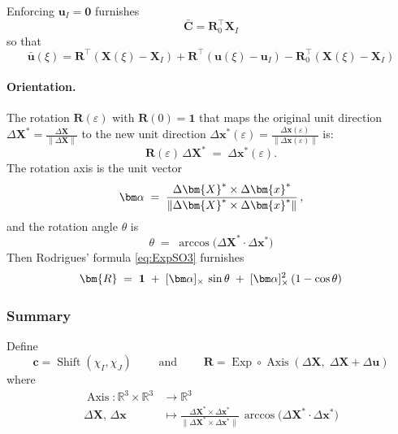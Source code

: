 Enforcing \(\bm{u}_I = \mathbf{0}\) furnishes
\begin{equation}
\bar{\bm{C}} = \bm{R}_0^{\top}\bm{X}_I
\label{eq:init-Cbar}
\end{equation}
so that
\begin{equation*}
\bar{\bm{u}}(\xi) = \bm{R}^{\top}(\bm{X}(\xi)-\bm{X}_I) 
 + \bm{R}^{\top}(\bm{u}(\xi)-\bm{u}_I)
 - \bm{R}_0^{\top}(\bm{X}(\xi) - \bm{X}_I)
\end{equation*}

\paragraph{Orientation.}

The rotation \(\bm{R}(\varepsilon)\) with
\(\bm{R}(0)=\mathbf{1}\) that maps the original unit direction
\(\Delta \bm{X}^{\ast} = \tfrac{\Delta \bm{X}}{\|\Delta \bm{X}\|}\) to
the new unit direction
\(\Delta \bm{x}^{\ast}(\varepsilon) = \tfrac{\Delta \bm{x}(\varepsilon)}{\|\Delta \bm{x}(\varepsilon)\|}\) is:
\[
\bm{R}(\varepsilon)\,\Delta \bm{X}^{\ast} 
\;=\;
\Delta \bm{x}^{\ast}(\varepsilon).
\]
%
The rotation axis is the unit vector 
\begin{equation}
\AlignAxis \;=\; \frac{\Delta \bm{X}^\ast \times \Delta \bm{x}^\ast}{\|\Delta \bm{X}^\ast \times \Delta \bm{x}^\ast\|}\,,
\label{eq:def-align-axis}
\end{equation}
and the rotation angle \(\theta\) is 
\begin{equation}
\theta \;=\; \arccos \bigl(\Delta \bm{X}^\ast \cdot \Delta \bm{x}^\ast\bigr)
\label{eq:arccos-dX-dx}
\end{equation}
Then Rodrigues' formula \eqref{eq:ExpSO3} furnishes 
\[
\bm{R} 
\;=\; 
\mathbf{1} 
\;+\; [\AlignAxis]_\times \,\sin \theta 
\;+\; [\AlignAxis]_\times^2 \,(1 - \cos \theta)
\]


\subsubsection{Summary}

Define 
\begin{equation*}
    \bm{c} = \operatorname{Shift}(\chi_{I}, \chi_J)
    \qquad\text{ and }\qquad
    \bm{R} = \operatorname{Exp}\circ \operatorname{Axis}(\Delta \bm{X},\; \Delta \bm{X} + \Delta \bm{u})
\end{equation*}
where
\begin{equation*}
\begin{aligned}
\operatorname{Axis} \colon \mathbb{R}^3\times\mathbb{R}^3 &\rightarrow \mathbb{R}^3 \\
\Delta \bm{X},\,\Delta\bm{x}
&\mapsto \frac{\Delta \bm{X}^\ast \times \Delta \bm{x}^\ast}{\|\Delta \bm{X}^\ast \times \Delta \bm{x}^\ast\|} \,
\arccos \bigl(\Delta \bm{X}^\ast \cdot \Delta \bm{x}^\ast\bigr)
\end{aligned}
\end{equation*}


